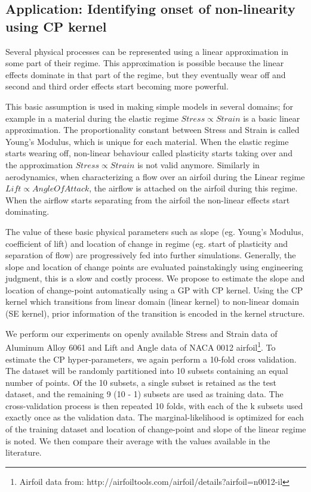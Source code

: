 \subsection{Application: Identifying onset of non-linearity  using CP kernel}\label{subsubsecCh4ApplicationCP}
Several physical processes can be represented using a linear approximation in some part of their regime. This approximation is possible because the linear effects dominate in that part of the regime, but they eventually wear off and second and third order effects start becoming more powerful. 

This basic assumption is used in making simple models in several domains; for example in a material during the elastic regime $Stress \propto Strain$ is a basic linear approximation. The proportionality constant between Stress and Strain is called Young's Modulus, which is unique for each material. When the elastic regime starts wearing off, non-linear behaviour called plasticity starts taking over and the approximation $Stress \propto Strain$ is not valid anymore. Similarly in aerodynamics, when characterizing a flow over an airfoil during the Linear regime  $ Lift \propto Angle Of Attack$, the airflow is attached on the airfoil during this regime. When the airflow starts separating from the airfoil the non-linear effects start dominating. 

\begin{mdframed}[hidealllines=true,backgroundcolor=blue!20]
The value of these basic physical parameters such as slope (eg. Young's Modulus, coefficient of lift) and location of change in regime (eg. start of plasticity and separation of flow) are progressively fed into further simulations. Generally, the slope and location of change points are evaluated painstakingly using engineering judgment, this is a slow and costly process. We propose to estimate the slope and location of change-point automatically using a GP with CP kernel. Using the CP kernel which transitions from linear domain (linear kernel) to non-linear domain (SE kernel), prior information of the transition is encoded in the kernel structure. 


We perform our experiments on openly available Stress and Strain data of Aluminum Alloy 6061 \cite{kaufman1999properties} and Lift and Angle data of NACA 0012 airfoil\footnote{Airfoil data from: http://airfoiltools.com/airfoil/details?airfoil=n0012-il}. To estimate the CP hyper-parameters, we again perform a 10-fold cross validation. The dataset will be randomly partitioned into 10 subsets containing an equal number of points. Of the 10 subsets, a single subset is retained as the test dataset, and the remaining 9 (10 - 1) subsets are used as training data. The cross-validation process is then repeated 10 folds, with each of the k subsets used exactly once as the validation data. The marginal-likelihood is optimized for each of the training dataset and location of change-point and slope of the linear regime is noted. We then compare their average with the values available in the literature. 
\end{mdframed}


